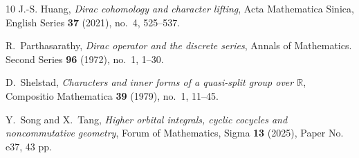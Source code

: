\documentclass[11pt]{amsart}
\theoremstyle{definition}
\theoremstyle{remark}
\begin{document}
\begin{thebibliography}{10}
J.-S. Huang, \emph{Dirac cohomology and character lifting}, Acta Mathematica
  Sinica, English Series \textbf{37} (2021), no.~4, 525--537.

R.~Parthasarathy, \emph{Dirac operator and the discrete series}, Annals of
  Mathematics. Second Series \textbf{96} (1972), no.~1, 1--30.

D.~Shelstad, \emph{Characters and inner forms of a quasi-split group over
  {$\mathbb R$}}, Compositio Mathematica \textbf{39} (1979), no.~1, 11--45.

Y.~Song and X.~Tang, \emph{Higher orbital integrals, cyclic cocycles and
  noncommutative geometry}, Forum of Mathematics, Sigma \textbf{13} (2025),
  Paper No. e37, 43 pp.

\end{thebibliography}
\end{document}

